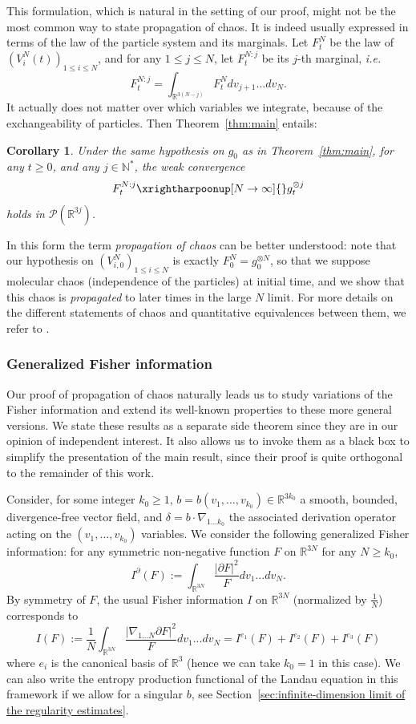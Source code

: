 \documentclass[11pt,a4paper]{article}
\theoremstyle{definition}
\theoremstyle{plain}
\newtheorem{corollary}[defi]{Corollary}
\begin{document}
This formulation, which is natural in the setting of our proof, might not be the most common way to state propagation of chaos. It is indeed usually expressed in terms of the law of the particle system and its marginals. Let $F^N_t$ be the law of $(V^N_i(t))_{1\leq i \leq N}$, and for any $1\leq j \leq N$, let $F^{N:j}_t$ be its $j$-th marginal, \textit{i.e.}
$$F^{N:j}_t=\int_{\mathbb{R}^{3(N-j)}} F^{N}_t dv_{j+1}...dv_N.$$
It actually does not matter over which variables we integrate, because of the exchangeability of particles. Then Theorem~\ref{thm:main} entails:

\begin{corollary}
\label{cor:main}
    Under the same hypothesis on $g_0$ as in Theorem~\ref{thm:main}, for any $t\geq 0$, and any $j\in\mathbb{N}^*$, the weak convergence 
    $$F^{N:j}_t \xrightharpoonup[N\rightarrow\infty]{} g_t^{\otimes j}$$
    holds in $\mathcal{P}(\mathbb{R}^{3j})$.
\end{corollary}

In this form the term \textit{propagation of chaos} can be better understood: note that our hypothesis on $(V^N_{i,0})_{1\leq i \leq N}$ is exactly $F^{N}_0=g_0^{\otimes N}$, so that we suppose molecular chaos (independence of the particles) at initial time, and we show that this chaos is \textit{propagated} to later times in the large $N$ limit. For more details on the different statements of chaos and quantitative equivalences between them, we refer to \cite{HaurayMischler2012}.

\subsubsection{Generalized Fisher information}

Our proof of propagation of chaos naturally leads us to study variations of the Fisher information and extend its well-known properties to these more general versions. We state these results as a separate side theorem since they are in our opinion of independent interest. It also allows us to invoke them as a black box to simplify the presentation of the main result, since their proof is quite orthogonal to the remainder of this work.

Consider, for some integer $k_0\geq 1$, $b=b(v_1,...,v_{k_0})\in\mathbb{R}^{3k_0}$ a smooth, bounded, divergence-free vector field, and $\delta=b\cdot\nabla_{1...k_0}$ the associated derivation operator acting on the $(v_1,...,v_{k_0})$ variables. We consider the following generalized Fisher information: for any symmetric non-negative function $F$ on $\mathbb{R}^{3N}$ for any $N\geq k_0$, 
$$I^\partial(F):=\int_{\mathbb{R}^{3N}}\frac{\vert \partial F\vert^2}{F} dv_1...dv_N.$$
By symmetry of $F$, the usual Fisher information $I$ on $\mathbb{R}^{3N}$ (normalized by $\frac{1}{N}$) corresponds to $$I(F):=\frac{1}{N}\int_{\mathbb{R}^{3N}}\frac{\vert \nabla_{1...N} \partial F\vert^2}{F} dv_1...dv_N=I^{e_1}(F)+I^{e_2}(F)+I^{e_3}(F)$$ where $e_i$ is the canonical basis of $\mathbb{R}^3$ (hence we can take $k_0=1$ in this case). We can also write the entropy production functional of the Landau equation in this framework if we allow for a singular $b$, see Section~\ref{sec:infinite-dimension limit of the regularity estimates}.
\end{document}
